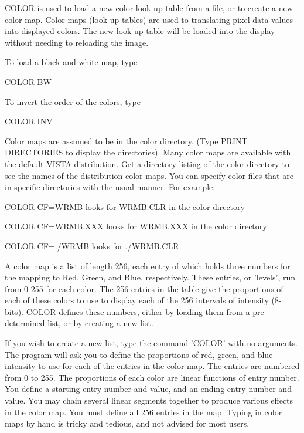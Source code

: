 COLOR is used to load a new color look-up table from a file, or to create a
new color map.  Color maps (look-up tables) are used to translating pixel
data values into displayed colors.  The new look-up table will be loaded
into the display without needing to reloading the image.

To load a black and white map, type 
\begin{hanging}
  \item{COLOR BW}
\end{hanging}
To invert the order of the colors, type
\begin{hanging}
  \item{COLOR INV}
\end{hanging}

Color maps are assumed to be in the color directory. (Type PRINT
DIRECTORIES to display the directories).  Many color maps are available
with the default VISTA distribution.  Get a directory listing of the color
directory to see the names of the distribution color maps.  You can specify
color files that are in specific directories with the usual manner.  For
example:
\begin{example}
  \item[COLOR CF=WRMB\hfill]{looks for WRMB.CLR in the color directory}
  \item[COLOR CF=WRMB.XXX\hfill]{looks for WRMB.XXX in the color directory}
  \item[COLOR CF=./WRMB\hfill]{looks for ./WRMB.CLR}
\end{example}

A color map is a list of length 256, each entry of which holds three
numbers for the mapping to Red, Green, and Blue, respectively.  These
entries, or 'levels', run from 0-255 for each color.  The 256 entries in
the table give the proportions of each of these colors to use to display
each of the 256 intervals of intensity (8-bits).  COLOR defines these
numbers, either by loading them from a pre-determined list, or by creating
a new list.

If you wish to create a new list, type the command 'COLOR' with no
arguments.  The program will ask you to define the proportions of red,
green, and blue intensity to use for each of the entries in the color map.
The entries are numbered from 0 to 255.  The proportions of each color are
linear functions of entry number.  You define a starting entry number and
value, and an ending entry number and value. You may chain several linear
segments together to produce various effects in the color map.  You must
define all 256 entries in the map.  Typing in color maps by hand is tricky
and tedious, and not advised for most users.

